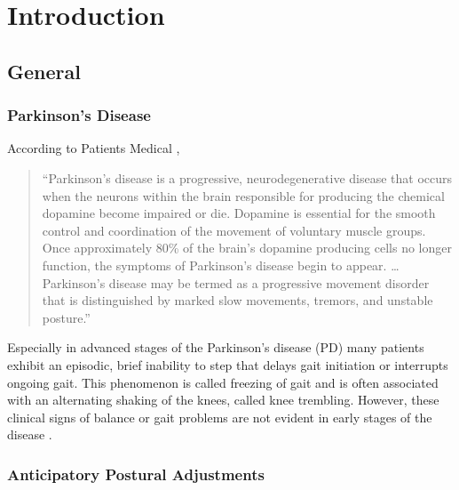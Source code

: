 \chapter{Introduction}
\label{ch:Introduction}

\section{General}

\subsection{Parkinson's Disease}

According to Patients Medical \cite{patients_medical_definition_2014}, \begin{quote}``Parkinson's disease is a progressive, neurodegenerative disease that occurs when the neurons within the brain responsible for producing the chemical dopamine become impaired or die. Dopamine is essential for the smooth control and coordination of the movement of voluntary muscle groups. Once approximately 80\% of the brain's dopamine producing cells no longer function, the symptoms of Parkinson's disease begin to appear. \dots Parkinson's disease may be termed as a progressive movement disorder that is distinguished by marked slow movements, tremors, and unstable posture.''\end{quote}

Especially in advanced stages of the Parkinson's disease (PD) many patients exhibit an episodic, brief inability to step that delays gait initiation or interrupts ongoing gait. This phenomenon is called freezing of gait and is often associated with an alternating shaking of the knees, called knee trembling. However, these clinical signs of balance or gait problems are not evident in early stages of the disease \cite{mancini_anticipatory_2009}\cite{jacobs_knee_2009}.

\subsection{Anticipatory Postural Adjustments}

